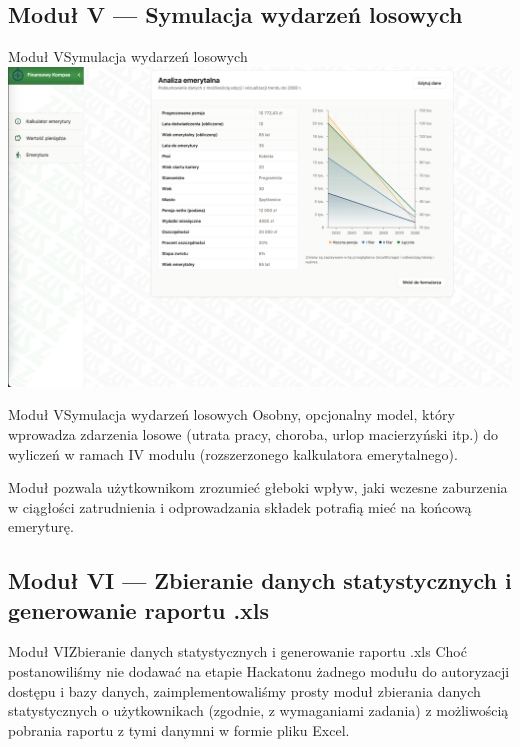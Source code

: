 \subsection{Moduł V --- Symulacja wydarzeń losowych}

\begin{frame}[t]{Moduł V}{Symulacja wydarzeń losowych}
\includegraphics[width=.8\textwidth]{img/module_4_extended_pension_calculator}
\end{frame}

\begin{frame}[t]{Moduł V}{Symulacja wydarzeń losowych}
Osobny, opcjonalny model, który wprowadza zdarzenia losowe
(utrata pracy, choroba, urlop macierzyński itp.)
do wyliczeń w ramach IV modulu (rozszerzonego kalkulatora emerytalnego).

\pause Moduł pozwala użytkownikom zrozumieć głeboki wpływ, jaki wczesne
zaburzenia w ciągłości zatrudnienia i odprowadzania składek potrafią mieć
na końcową emeryturę.
\end{frame}

\subsection{Moduł VI --- Zbieranie danych statystycznych i generowanie raportu .xls}

\begin{frame}[t]{Moduł VI}{Zbieranie danych statystycznych i generowanie raportu .xls}
Choć postanowiliśmy nie dodawać na etapie Hackatonu żadnego modułu do autoryzacji dostępu
i bazy danych, zaimplementowaliśmy prosty moduł zbierania danych statystycznych o użytkownikach
(zgodnie, z wymaganiami zadania) z możliwością pobrania raportu z tymi danymni w formie
pliku Excel.
\end{frame}